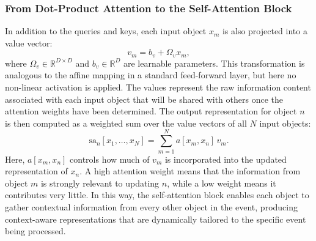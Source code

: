 \subsubsection{From Dot-Product Attention to the Self-Attention Block}
In addition to the queries and keys, each input object $x_m$ is also projected into a value vector:
\begin{equation}
v_m = b_v + \Omega_v x_m,
\end{equation}
where $\Omega_v \in \mathbb{R}^{D \times D}$ and $b_v \in \mathbb{R}^D$ are learnable parameters. This transformation is analogous to the affine mapping in a standard feed-forward layer, but here no non-linear activation is applied. The values represent the raw information content associated with each input object that will be shared with others once the attention weights have been determined. The output representation for object $n$ is then computed as a weighted sum over the value vectors of all $N$ input objects:
\begin{equation}
\mathrm{sa}_n[x_1, \dots, x_N] = \sum_{m=1}^N a[x_m, x_n] \, v_m.
\end{equation}
Here, $a[x_m, x_n]$ controls how much of $v_m$ is incorporated into the updated representation of $x_n$. A high attention weight means that the information from object $m$ is strongly relevant to updating $n$, while a low weight means it contributes very little. In this way, the self-attention block enables each object to gather contextual information from every other object in the event, producing context-aware representations that are dynamically tailored to the specific event being processed.
